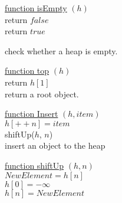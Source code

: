 \documentclass{article}
\begin{document}
\begin{algorithm}
    

    \underline{function isEmpty} $(h)$\\
      {
        return $false$\\
      }
      {
        return $true$\\
      }
    
    \caption{check whether a heap is empty.}
\end{algorithm}

\begin{algorithm}
    

    \underline{function top} $(h)$\\
        return $h[1]$\\
    \caption{return a root object.}
\end{algorithm}



\begin{algorithm}
    

    \underline{function Insert} $(h, item)$\\
        $h[++n] = item$\\
        shiftUp($h$, $n$)\\
    \caption{insert an object to the heap}
    
    \BlankLine
    \BlankLine
    
    \underline{function shiftUp} $(h, n)$\\
    $NewElement = h[n]$\\
    $h[0] = -\infty$\\
    $h[n] = NewElement$
    
\end{algorithm}
\end{document}

